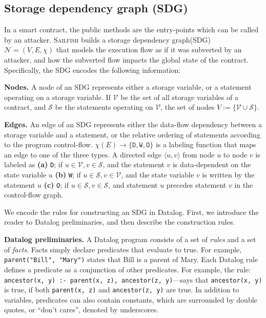 \documentclass[conference, romanappendices]{tex/IEEEtran}
\theoremstyle{bfnote}
\newcommand{\toolname}{\textsc{Sailfish}\xspace}
\newcommand{\smart}{smart contract}
\newcommand{\sdg}{storage dependency graph\xspace}
\begin{document}
\subsection{\textbf{Storage dependency graph (SDG)}}
\label{sec:sdg}
In a \smart, the public methods 
are the entry-points which can be called by an attacker.
\toolname builds a \sdg ({SDG\EndAccSupp{}}) $\mathcal{N} = (V, E, \chi)$ that models the execution flow as if it was subverted by an attacker, and how the subverted flow impacts the global state of the contract.
Specifically, the {SDG\EndAccSupp{}} encodes the following information:

\vspace{1mm}
\noindent
\textbf{Nodes.}
A node of an {SDG\EndAccSupp{}} represents either a storage variable, or a statement operating on a storage variable.
If $\mathcal{V}$ be the set of all storage variables of a contract, and $\mathcal{S}$ be the statements operating on $\mathcal{V}$, the set of nodes $V := \{\mathcal{V} \cup \mathcal{S}\}$.

\vspace{1mm}
\noindent
\textbf{Edges.}
An edge of an {SDG\EndAccSupp{}} represents either the data-flow dependency between a storage variable and a statement, or the relative ordering of statements according to the program control-flow.
$\chi(E) \rightarrow \{\texttt{D}, \texttt{W}, \texttt{O}\}$ is a labeling function that maps an edge to one of the three types.
A directed edge $\langle u,v \rangle$ from node $u$ to node $v$ is labeled as
\textbf{(a)} \texttt{D}; if $u \in \mathcal{V}, v \in \mathcal{S}$, and the statement $v$ is data-dependent on the state variable $u$
\textbf{(b)} \texttt{W}; if $u \in \mathcal{S}, v \in \mathcal{V}$, and the state variable $v$ is written by the statement $u$
\textbf{(c)} \texttt{O}; if $u \in \mathcal{S}, v \in \mathcal{S}$, and statement $u$ precedes statement $v$ in the control-flow graph.



We encode the rules for constructing an {SDG\EndAccSupp{}} in Datalog.
First, we introduce the reader to Datalog preliminaries, and then describe the construction rules.

\noindent
\textbf{Datalog preliminaries.}
A Datalog program  consists of a set of \emph{rules} and a set of \emph{facts}. 
Facts simply declare predicates that evaluate to true. For example, 
{\tt parent("Bill", "Mary")} states that {Bill\EndAccSupp{}} is a parent of Mary. Each Datalog rule defines a predicate as a conjunction of other
predicates. For example, the rule: \texttt{ancestor(x, y) :- parent(x, z), ancestor(z, y)}---says that
\verb+ancestor(x, y)+ is true, if both \verb+parent(x, z)+ and
\verb+ancestor(z, y)+ are true. In addition to variables, predicates can 
also contain constants, 
which are surrounded by double quotes, or
``don't cares'',  denoted by underscores.
\end{document}
